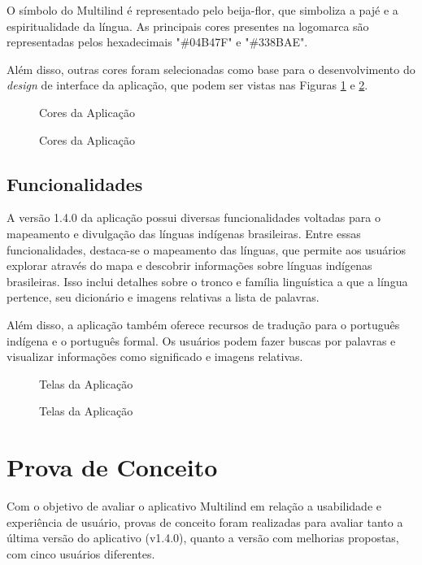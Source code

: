 O símbolo do Multilind é representado pelo beija-flor, que simboliza a pajé e a espiritualidade da língua. As principais cores presentes na logomarca são representadas pelos hexadecimais "\#04B47F" e "\#338BAE".

Além disso, outras cores foram selecionadas como base para o desenvolvimento do \textit{design} de interface da aplicação, que podem ser vistas nas Figuras \ref{fig16} e \ref{fig17}.

\begin{figure}[h!]
	\centering
	\caption{Cores da Aplicação}
	\label{fig16}
\end{figure}

\begin{figure}[h!]
	\centering
	\caption{Cores da Aplicação}
	\label{fig17}
\end{figure}

\subsection{Funcionalidades}
\label{Funcionalidades}
A versão 1.4.0 da aplicação possui diversas funcionalidades voltadas para o mapeamento e divulgação das línguas indígenas brasileiras. Entre essas funcionalidades, destaca-se o mapeamento das línguas, que permite aos usuários 
explorar através do mapa e descobrir informações sobre línguas indígenas brasileiras. Isso inclui detalhes sobre o tronco e família linguística a que a língua pertence, seu dicionário e imagens relativas a lista de palavras.

Além disso, a aplicação também oferece recursos de tradução para o português indígena e o português formal. Os usuários podem fazer buscas por palavras e visualizar informações como significado e imagens relativas.

\begin{figure}[h!]
	\centering
	\caption{Telas da Aplicação}
	\label{fig18}
\end{figure}

\begin{figure}[h!]
	\centering
	\caption{Telas da Aplicação}
	\label{fig19}
\end{figure}


\section{Prova de Conceito}
\label{sec:Prova de Conceito}
Com o objetivo de avaliar o aplicativo Multilind em relação a usabilidade e experiência de usuário, provas de conceito foram 
realizadas para avaliar tanto a última versão do aplicativo (v1.4.0), quanto a versão com melhorias propostas, com cinco usuários diferentes.

